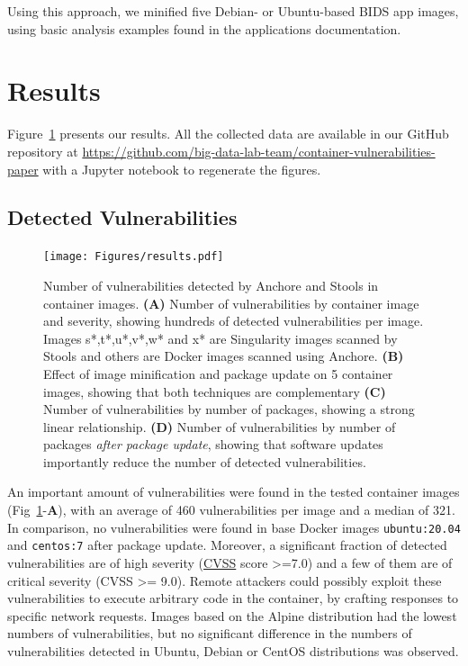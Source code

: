 \documentclass[a4paper,num-refs]{oup-contemporary}
\begin{document}
Using this approach, we minified five Debian- or Ubuntu-based BIDS app images,
using basic analysis examples found in the applications documentation.

\section{Results}

Figure~\ref{fig:vulnerabilities} presents our results. All the collected
data are available in our GitHub repository at
\url{https://github.com/big-data-lab-team/container-vulnerabilities-paper}
with a Jupyter notebook to regenerate the figures. 

\subsection{Detected Vulnerabilities}


\begin{figure}
\texttt{[image: Figures/results.pdf]}
\caption{\label{fig:vulnerabilities} Number of vulnerabilities detected by
Anchore and Stools in container images. \textbf{(A)} Number of vulnerabilities by
container image and severity, showing hundreds of detected vulnerabilities
per image. Images s*,t*,u*,v*,w* and x* are Singularity images scanned by Stools and
others are Docker images scanned using Anchore. \textbf{(B)} Effect of image minification and
package update on 5 container images, showing that both techniques are
complementary \textbf{(C)} Number of vulnerabilities by number of
packages, showing a strong linear relationship. \textbf{(D)} Number of
vulnerabilities by number of packages \emph{after package update}, showing that software updates 
importantly reduce the number of detected vulnerabilities.}
\end{figure}

An important amount of vulnerabilities were found in the tested container
 images (Fig~\ref{fig:vulnerabilities}-\textbf{A}), with an average of 460 vulnerabilities
  per image and a median of 321. In comparison, no vulnerabilities were found in base
 Docker images \texttt{ubuntu:20.04} and \texttt{centos:7} after package
 update. Moreover, a significant fraction of detected vulnerabilities are
 of high severity
 (\href{https://www.first.org/cvss/specification-document}{CVSS} score
 >=7.0) and a few of them are of critical severity (CVSS >= 9.0). Remote
 attackers could possibly exploit these vulnerabilities to execute
 arbitrary code in the container, by crafting responses to specific network
 requests. Images based on the Alpine distribution 
 had the lowest numbers of vulnerabilities, but no significant difference
 in the numbers of vulnerabilities detected in 
 Ubuntu, Debian or CentOS distributions was observed.
\end{document}
